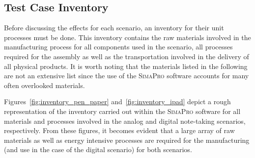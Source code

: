 \subsection{Test Case Inventory}\label{subsec:inventory}
Before discussing the effects for each scenario, an inventory for their unit processes must be done. This inventory contains the raw materials involved in the manufacturing process for all components used in the scenario, all processes required for the assembly as well as the transportation involved in the delivery of all physical products. It is worth noting that the materials listed in the following are not an extensive list since the use of the \textsc{SimaPro} software accounts for many often overlooked materials.

Figures~\ref{fig:inventory_pen_paper} and~\ref{fig:inventory_ipad} depict a rough representation of the inventory carried out within the \textsc{SimaPro} software for all materials and processes involved in the analog and digital note-taking scenarios, respectively. From these figures, it becomes evident that a large array of raw materials as well as energy intensive processes are required for the manufacturing (and use in the case of the digital scenario) for both scenarios. 

